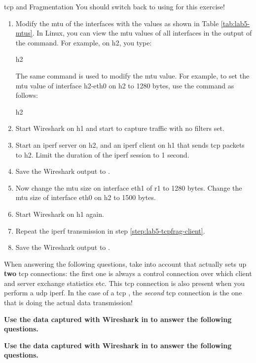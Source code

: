 \begin{exercise}{\ac{tcp} and Fragmentation}
\remark You should switch back to using  for this exercise!
\begin{enumerate}
	\item Modify the \ac{mtu} of the interfaces with the values as shown in Table \ref{tab:lab5-mtus}. In Linux, you can view the \ac{mtu} values of all interfaces in the output of the  command. For example, on h2, you type:
	\begin{cmdblock}[gobble=2]
		h2%
	\end{cmdblock}
	The same command is used to modify the \ac{mtu} value. For example, to set the \ac{mtu} value of interface h2-eth0 on h2 to 1280 bytes, use the  command as follows:
	\begin{cmdblock}[gobble=2]
		h2%
	\end{cmdblock}
	\item Start Wireshark on h1 and start to capture traffic with no filters set.
	\item \label{step:lab5-tcpfrag-client} Start an iperf server on h2, and an iperf client on h1 that sends \ac{tcp} packets to h2. Limit the duration of the iperf session to 1 second.
	\item Save the Wireshark output to . 
	\item Now change the \ac{mtu} size on interface eth1 of r1 to 1280 bytes. Change the \ac{mtu} size of interface eth0 on h2 to 1500 bytes.
	\item Start Wireshark on h1 again.
	\item Repeat the iperf transmission in step \ref{step:lab5-tcpfrag-client}.
	\item Save the Wireshark output to .
\end{enumerate}

\remark When answering the following questions, take into account that  actually sets up \textbf{two} \acs{tcp} connections: the first one is always a control connection over which client and server exchange statistics etc. This \acs{tcp} connection is also present when you perform a \acs{udp} iperf. In the case of a \acs{tcp} , the \emph{second} \acs{tcp} connection is the one that is doing the actual data transmission!

\textbf{Use the data captured with Wireshark in  to answer the following questions.}


\textbf{Use the data captured with Wireshark in  to answer the following questions.}


\end{exercise}


